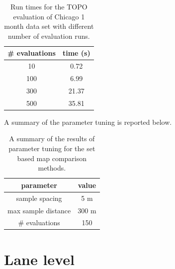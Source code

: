 \begin{table}[H]
\centering
\caption{Run times for the TOPO evaluation of Chicago 1 month data set with different number of evaluation runs.}
\label{tab:experiments/num_evals}
\begin{tabular}{cc}
\# evaluations & time (s) \\ \hline
10 & 0.72 \\
100 & 6.99 \\
300 & 21.37 \\
500 & 35.81 \\ \hline
\end{tabular}
\end{table}

A summary of the parameter tuning is reported below.

\begin{table}[H]
\centering
\caption{A summary of the results of parameter tuning for the set based map comparison methods.}
\label{tab:experimenst/tuning}
\begin{tabular}{cc}
parameter & value \\ \hline
sample spacing & 5 m \\
max sample distance & 300 m \\
\# evaluations & 150 \\ \hline
\end{tabular}
\end{table}


\section{Lane level}


